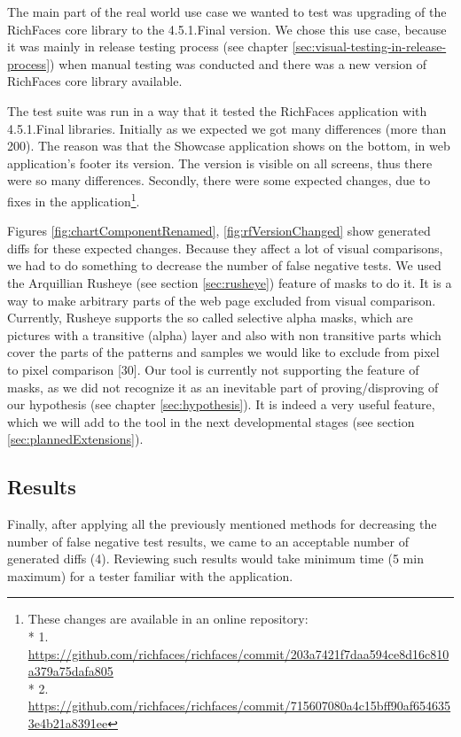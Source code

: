 \documentclass[11pt,oneside,final]{fithesis2}
\begin{document}
  The main part of the real world use case we wanted to test was upgrading of the RichFaces core library to the 4.5.1.Final version.
  We chose this use case, because it was mainly in release testing process (see chapter \ref{sec:visual-testing-in-release-process})
  when manual testing was conducted and there was a new version of RichFaces core library available.
  
  The test suite was run in a way that it tested the RichFaces application with 4.5.1.Final libraries. Initially as we expected we
  got many differences (more than 200). The reason was that the Showcase application shows on the bottom, in web application's footer its version. 
  The version is visible on all screens, thus there were so many differences. Secondly, there were some expected changes, due to
  fixes in the application\footnote{These changes are available in an online repository:\\*
  1. \url{https://github.com/richfaces/richfaces/commit/203a7421f7daa594ce8d16c810a379a75dafa805}\\* 
  2. \url{https://github.com/richfaces/richfaces/commit/715607080a4c15bff90af6546353e4b21a8391ee}}.
  
  Figures \ref{fig:chartComponentRenamed}, \ref{fig:rfVersionChanged} show generated diffs for these expected changes. Because they
  affect a lot of visual comparisons, we had to do something to decrease the number of false negative tests. We used the Arquillian Rusheye 
  (see section \ref{sec:rusheye}) feature of masks to do it. It is a way to make arbitrary parts of the web page excluded from
  visual comparison. Currently, Rusheye supports the so called selective alpha masks, which are pictures with a transitive (alpha) layer
  and also with non transitive parts which cover the parts of the patterns and samples we would like to exclude from pixel to
  pixel comparison [30]. Our tool is currently not supporting the feature of masks, as we did not recognize it as an inevitable part of
  proving/disproving of our hypothesis (see chapter \ref{sec:hypothesis}). It is indeed a very useful feature, which we will
  add to the tool in the next developmental stages (see section \ref{sec:plannedExtensions}).
  
  \subsection{Results}
  
  Finally, after applying all the previously mentioned methods for decreasing the number of false negative test results, we came to an acceptable
  number of generated diffs (4). Reviewing such results would take minimum time (5 min maximum) for a tester familiar with the application.
  
\end{document}
